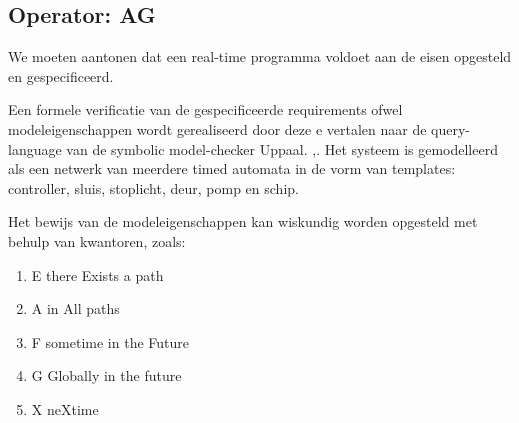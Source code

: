 \documentclass{article}
\begin{document}
%	
%	
%	
	\subsection{Operator: AG}
		We moeten aantonen dat een real-time programma voldoet aan de eisen opgesteld en gespecificeerd. 
	
	Een formele verificatie van de gespecificeerde requirements ofwel modeleigenschappen wordt gerealiseerd door deze e vertalen naar de query-language van de symbolic model-checker Uppaal.  \cite{alurSystemClok},\cite{alurModelHybrid}.
	Het systeem is gemodelleerd als een netwerk van meerdere timed automata in de vorm van templates: controller, sluis, stoplicht, deur, pomp en schip.
	
	Het bewijs van de modeleigenschappen kan wiskundig worden opgesteld met behulp van kwantoren, zoals:
	\begin{enumerate}
		\item E there Exists a path
		\item A in All paths
		\item F sometime in the Future
		\item G Globally in the future
		\item X neXtime
	\end{enumerate}
\end{document}
